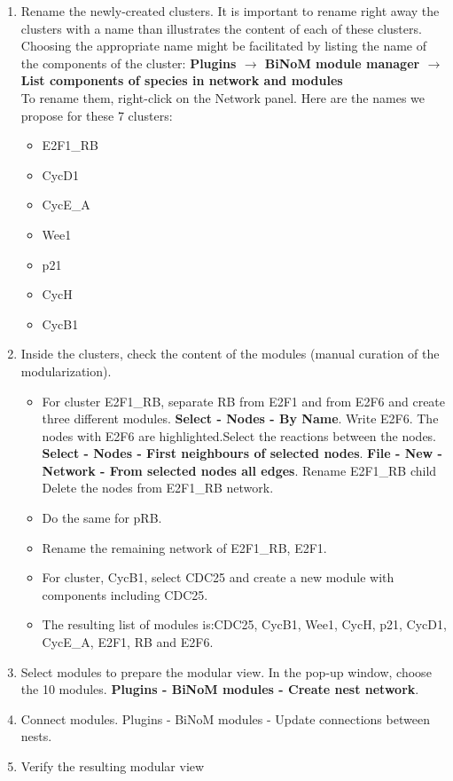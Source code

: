 \documentclass[10pt]{bmc_article}
\newenvironment{bmcformat}{\baselineskip20pt\sloppy\setboolean{publ}{false}}{\baselineskip20pt\sloppy}
\begin{document}
\begin{bmcformat}
\begin{enumerate}
\item	Rename the newly-created clusters.
It is important to rename right away the clusters with a name than illustrates the content of each of these clusters. 
Choosing the appropriate name might be facilitated by listing the name of the components of the cluster: \textbf{Plugins $\rightarrow$ BiNoM module manager $\rightarrow$ List components of species in network and modules} \\
To rename them, right-click on the Network panel.
Here are the names we propose for these 7 clusters: 
\begin{itemize}
\item	E2F1\_RB
\item	CycD1
\item CycE\_A
\item Wee1
\item p21
\item CycH
\item CycB1
\end{itemize}

\item	Inside the clusters, check the content of the modules (manual curation
of the modularization).

\begin{itemize}
\item	For cluster E2F1\_RB, separate RB from E2F1 and from E2F6 and create
three different modules. \textbf{Select - Nodes - By Name}. Write E2F6. The
nodes with E2F6 are highlighted.Select the reactions between the nodes.
\textbf{Select - Nodes - First neighbours of selected nodes}. \textbf{File - New
- Network - From selected nodes all edges}. Rename E2F1\_RB child Delete the
nodes from E2F1\_RB network.
\item	Do the same for pRB.
\item	Rename the remaining network of E2F1\_RB, E2F1.
\item	For cluster, CycB1, select CDC25 and create a new module with components
including CDC25.
\item	The resulting list of modules is:CDC25, CycB1, Wee1, CycH, p21, CycD1,
CycE\_A, E2F1, RB and E2F6.
\end{itemize}

\item	Select modules to prepare the modular view. In the pop-up window, choose
the 10 modules. \textbf{Plugins - BiNoM modules - Create nest network}.
\item	Connect modules. Plugins - BiNoM modules - Update connections between
nests.
\item   Verify the resulting modular view


\end{enumerate}
\end{bmcformat}
\end{document}
